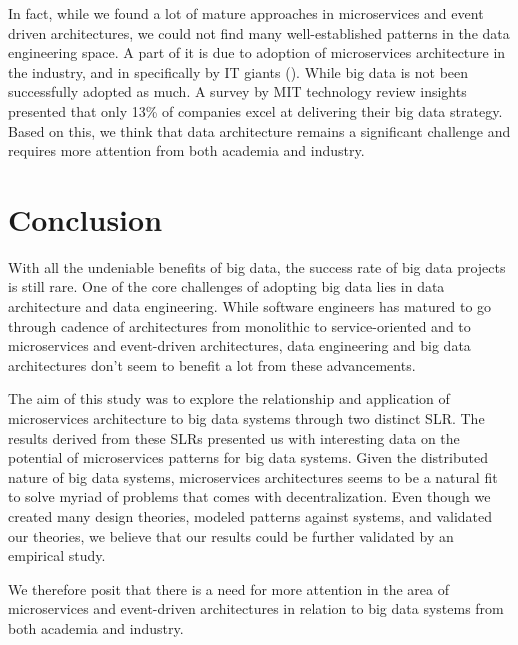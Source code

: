 \documentclass[conference]{IEEEtran}
\begin{document}
In fact, while we found a lot of mature approaches in microservices and event driven architectures, we could not find many well-established patterns in the data engineering space. A part of it is due to adoption of microservices architecture in the industry, and in specifically by IT giants (\cite{Statisica}). While big data is not been successfully adopted as much. A survey by MIT technology review insights presented that only 13\% of companies excel at delivering their big data strategy. Based on this, we think that data architecture remains a significant challenge and requires more attention from both academia and industry. 


\section{Conclusion}

With all the undeniable benefits of big data, the success rate of big data projects is still rare. One of the core challenges of adopting big data lies in data architecture and data engineering. While software engineers has matured to go through cadence of architectures from monolithic to service-oriented and to microservices and event-driven architectures, data engineering and big data architectures don't seem to benefit a lot from these advancements. 

The aim of this study was to explore the relationship and application of microservices architecture to big data systems through two distinct SLR. The results derived from these SLRs presented us with interesting data on the potential of microservices patterns for big data systems. Given the distributed nature of big data systems, microservices architectures seems to be a natural fit to solve myriad of problems that comes with decentralization. Even though we created many design theories, modeled patterns against systems, and validated our theories, we believe that our results could be further validated by an empirical study. 

We therefore posit that there is a need for more attention in the area of microservices and event-driven architectures in relation to big data systems from both academia and industry. 





\end{document}
